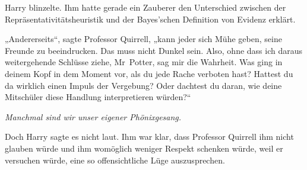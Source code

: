 Harry blinzelte. Ihm hatte gerade ein Zauberer den Unterschied zwischen der Repräsentativitätsheuristik und der Bayes’schen Definition von Evidenz erklärt.

„Andererseits“, sagte Professor Quirrell, „kann jeder sich Mühe geben, seine Freunde zu beeindrucken. Das muss nicht Dunkel sein. Also, ohne dass ich daraus weitergehende Schlüsse ziehe, Mr~Potter, sag mir die Wahrheit. Was ging in deinem Kopf in dem Moment vor, als du jede Rache verboten hast? Hattest du da wirklich einen Impuls der Vergebung? Oder dachtest du daran, wie deine Mitschüler diese Handlung interpretieren würden?“

\emph{Manchmal sind wir unser eigener Phönixgesang.}

Doch Harry sagte es nicht laut. Ihm war klar, dass Professor Quirrell ihm nicht glauben würde und ihm womöglich weniger Respekt schenken würde, weil er versuchen würde, eine so offensichtliche Lüge auszusprechen.

